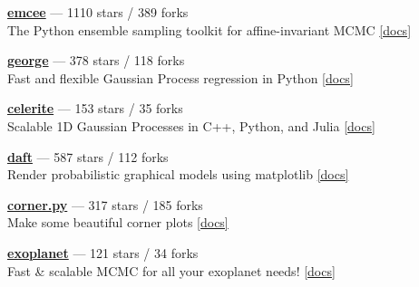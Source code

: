 \item \href{https://github.com/dfm/emcee}{{\bf emcee}} --- 1110 stars / 389 forks \\
The Python ensemble sampling toolkit for affine-invariant MCMC \href{https://emcee.readthedocs.io}{[docs]}

\item \href{https://github.com/dfm/george}{{\bf george}} --- 378 stars / 118 forks \\
Fast and flexible Gaussian Process regression in Python \href{http://george.readthedocs.io}{[docs]}

\item \href{https://github.com/dfm/celerite}{{\bf celerite}} --- 153 stars / 35 forks \\
Scalable 1D Gaussian Processes in C++, Python, and Julia \href{http://celerite.rtfd.io}{[docs]}

\item \href{https://github.com/daft-dev/daft}{{\bf daft}} --- 587 stars / 112 forks \\
Render probabilistic graphical models using matplotlib \href{https://docs.daft-pgm.org}{[docs]}

\item \href{https://github.com/dfm/corner.py}{{\bf corner.py}} --- 317 stars / 185 forks \\
Make some beautiful corner plots \href{http://corner.readthedocs.io}{[docs]}

\item \href{https://github.com/exoplanet-dev/exoplanet}{{\bf exoplanet}} --- 121 stars / 34 forks \\
Fast {\&} scalable MCMC for all your exoplanet needs!  \href{https://docs.exoplanet.codes}{[docs]}